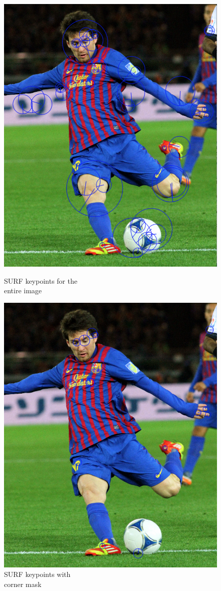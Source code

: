 \begin{figure}[ht!]
\centering
\begin{minipage}{.5\textwidth}
	\centering
	\includegraphics[width=.8\linewidth]{images/messiSurf.png}
	\caption{SURF keypoints for the\\ entire image}
	\label{fig:messiSurft}
\end{minipage}%
\begin{minipage}{.5\textwidth}
	\centering
	\includegraphics[width=.8\linewidth]{images/messiCornerSurf.png}
	\caption{SURF keypoints with\\ corner mask}
	\label{fig:messiCornerSurf}
\end{minipage}
\end{figure}


